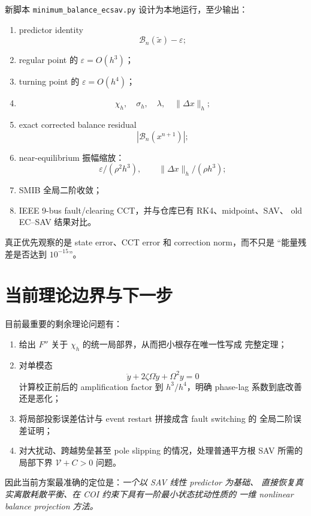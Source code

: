 \documentclass[UTF8,11pt,a4paper]{ctexart}
\theoremstyle{definition}
\theoremstyle{remark}
\newcommand{\V}{\mathcal V}
\newcommand{\B}{\mathcal B}
\newcommand{\wt}{\widetilde}
\begin{document}
新脚本 \texttt{minimum\_balance\_ecsav.py} 设计为本地运行，至少输出：

\begin{enumerate}[label=(\arabic*)]
 \item predictor identity
 \[
  \B_n(\wt x)-\varepsilon;
 \]
 \item regular point 的 \(\varepsilon=O(h^3)\)；
 \item turning point 的 \(\varepsilon=O(h^4)\)；
 \item
 \[
  \chi_h,\quad
  \sigma_h,\quad
  \lambda,\quad
  \|\Delta x\|_h;
 \]
 \item exact corrected balance residual
 \[
  |\B_n(x^{n+1})|;
 \]
 \item near-equilibrium 振幅缩放：
 \[
  \varepsilon/(\rho^2h^3),
  \qquad
  \|\Delta x\|_h/(\rho h^3);
 \]
 \item SMIB 全局二阶收敛；
 \item IEEE 9-bus fault/clearing CCT，并与仓库已有 RK4、midpoint、SAV、
 old EC--SAV 结果对比。
\end{enumerate}

真正优先观察的是 state error、CCT error 和 correction norm，而不只是
“能量残差是否达到 \(10^{-15}\)”。

\section{当前理论边界与下一步}

目前最重要的剩余理论问题有：
\begin{enumerate}[label=(\arabic*)]
 \item 给出 \(F''\) 关于 \(\chi_h\) 的统一局部界，从而把小根存在唯一性写成
 完整定理；
 \item 对单模态
 \[
  \ddot y+2\zeta\Omega\dot y+\Omega^2y=0
 \]
 计算校正前后的 amplification factor 到 \(h^3/h^4\)，明确 phase-lag
 系数到底改善还是恶化；
 \item 将局部投影误差估计与 event restart 拼接成含 fault switching 的
 全局二阶误差证明；
 \item 对大扰动、跨越势垒甚至 pole slipping 的情况，处理普通平方根 SAV
 所需的局部下界 \( \V+C>0 \) 问题。
\end{enumerate}

因此当前方案最准确的定位是：\emph{一个以 SAV 线性 predictor 为基础、
直接恢复真实离散耗散平衡、在 COI 约束下具有一阶最小状态扰动性质的
一维 nonlinear balance projection 方法。}
\end{document}
